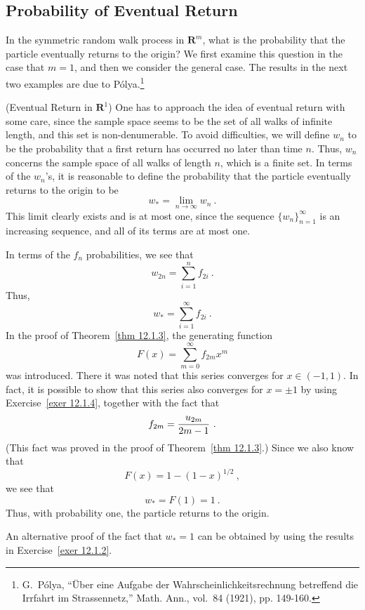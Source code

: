 \subsection*{Probability of Eventual Return}
In the symmetric random walk process in ${\mathbf R}^m$, what is the probability that the particle
eventually returns to the origin?  We first examine this question in the case that $m = 1$, and
then we consider the general case.  The results in the next two examples are due to
P\'olya.\footnote{G.~P\'olya, ``\"Uber eine Aufgabe der Wahrscheinlichkeitsrechnung betreffend
die Irrfahrt im Strassennetz,'' Math. Ann., vol.~84 (1921), pp. 149-160.}
\begin{example}\label{exam 12.1.0.5}(Eventual Return in ${\mathbf R}^1$)
One has to approach the idea of eventual return with some care, since the
sample space seems to be the set of all walks of infinite length, and this set is
non-denumerable.  To avoid difficulties, we will define $w_n$ to be the probability that a first
return has occurred no later than time $n$.  Thus, $w_n$ concerns the sample space of all walks
of length $n$, which is a finite set.  In terms of the $w_n$'s, it is reasonable to define the
probability that the particle eventually returns to the origin to be 
$$w_* = \lim_{n \rightarrow \infty} w_n\ .$$
This limit clearly exists and is at most one, since the sequence $\{w_n\}_{n = 1}^\infty$ is an
increasing sequence, and all of its terms are at most one.  
\par
In terms of the $f_n$ probabilities, we see that
$$w_{2n} = \sum_{i = 1}^n f_{2i}\ .$$
Thus, 
$$w_* = \sum_{i = 1}^\infty f_{2i}\ .$$
In the proof of Theorem~\ref{thm 12.1.3}, the generating function 
$$F(x) = \sum_{m = 0}^\infty f_{2m}x^m$$ 
was introduced.  There it was noted that this series converges for $x \in (-1, 1)$.  In fact, it
is possible to show that this series also converges for $x = \pm 1$ by using Exercise~\ref{exer
12.1.4}, together with the fact that
$$f_{2m} = {{u_{2m}}\over{2m-1}}\ .$$
(This fact was proved in the proof of Theorem~\ref{thm 12.1.3}.)  Since we also know that 
$$F(x) = 1 - (1-x)^{1/2}\ ,$$
we see that 
$$w_* = F(1) = 1\ .$$
Thus, with probability one, the particle returns to the origin.
\par
An alternative proof of the fact that $w_* = 1$ can be obtained by using the
results in Exercise~\ref{exer 12.1.2}.
\end{example}
\par
